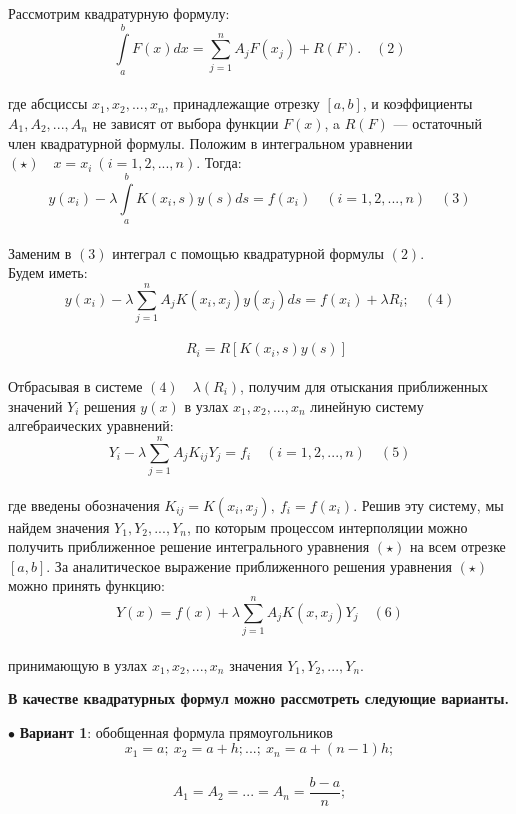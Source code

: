 \documentclass[12pt]{article}
\begin{document}
Рассмотрим квадратурную формулу:\\
$$ \int\limits_a^b F(x) dx = \sum\limits_{j=1}^n A_{j}F(x_{j}) + R(F) . \quad (2)$$ \\
где абсциссы $ x_{1}, x_{2}, ..., x_{n} $, принадлежащие отрезку $ [a,b] $, и коэффициенты $ A_{1}, A_{2}, ..., A_{n} $ не зависят от выбора функции $ F(x) $, a $ R(F) $ — остаточный член квадратурной формулы. Положим в интегральном уравнении $ (\star) \quad x = x_{i} \: (i = 1, 2, ..., n) $. Тогда:\\
$$ y(x_{i}) - \lambda\int\limits_a^b K(x_{i}, s) y(s) ds = f(x_{i}) \quad (i = 1, 2, ..., n) \quad (3) $$\\
Заменим в $ (3) $ интеграл с помощью квадратурной формулы $(2) $.\\ 
Будем иметь: \\
$$ y(x_{i}) - \lambda\sum\limits_{j=1}^n A_{j}K(x_{i}, x_{j}) y(x_{j}) ds = f(x_{i}) + \lambda R_{i}; \quad (4)$$\\
 $$\quad R_{i} = R[K(x_{i}, s)y(s)]  $$\\
Отбрасывая в системе $ (4) \quad \lambda(R_{i}) $, получим для отыскания приближенных значений $ Y_{i} $ решения $ y(x) $ в узлах $ x_{1}, x_{2}, ..., x_{n} $ линейную систему алгебраических уравнений:\\
$$ Y_{i} - \lambda\sum\limits_{j=1}^n A_{j}K_{ij}Y_{j} = f_{i} \quad (i = 1, 2, ..., n) \quad (5) $$\\
где введены обозначения $ K_{ij} = K(x_{i},x_{j}), \: f_{i} = f(x_{i})$. Решив эту систему, мы найдем значения $ Y_{1}, Y_{2}, ..., Y_{n} $, по которым процессом интерполяции можно получить приближенное решение интегрального уравнения $ (\star) $ на всем отрезке $ [a,b] $. За аналитическое выражение приближенного решения уравнения $ (\star) $ можно принять функцию:\\
$$ Y(x) = f(x) + \lambda\sum\limits_{j=1}^n A_{j}K(x,x_{j})Y_{j} \quad (6)$$\\
принимающую в узлах $ x_{1},x_{2},..., x_{n} $ значения $ Y_{1}, Y_{2},..., Y_{n} $. \\
\begin{center}
\textbf{	В качестве квадратурных формул можно рассмотреть следующие варианты.}
\end{center}
$ \bullet $ \textbf{Вариант 1}: обобщенная 
формула прямоугольников\\
$$ x_{1} = a; \: x_{2} = a+h; ...; \: x_{n} = a+(n-1)h;  $$\\
$$ A_{1} = A_{2} = ... = A_{n} = \frac{b-a}{n};  $$\\
\end{document}
